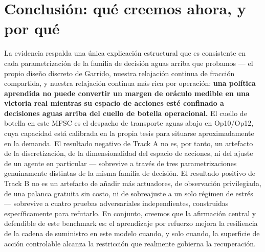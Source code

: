 \documentclass[11pt]{article}
\begin{document}
\section{Conclusión: qué creemos ahora, y por qué}

La evidencia respalda una única explicación estructural que es consistente
en cada parametrización de la familia de decisión aguas arriba que
probamos --- el propio diseño discreto de Garrido, nuestra relajación
continua de fracción compartida, y nuestra relajación continua más rica
por operación: \textbf{una política aprendida no puede convertir un margen
de oráculo medible en una victoria real mientras su espacio de acciones
esté confinado a decisiones aguas arriba del cuello de botella
operacional.} El cuello de botella en este MFSC es el despacho de
transporte aguas abajo en Op10/Op12, cuya capacidad está calibrada en la
propia tesis para situarse aproximadamente en la demanda. El resultado
negativo de Track A no es, por tanto, un artefacto de la discretización,
de la dimensionalidad del espacio de acciones, ni del ajuste de un agente
en particular --- sobrevive a través de tres parametrizaciones
genuinamente distintas de la misma familia de decisión. El resultado
positivo de Track B no es un artefacto de añadir más actuadores, de
observación privilegiada, de una palanca gratuita sin costo, ni de
sobreajuste a un solo régimen de estrés --- sobrevive a cuatro pruebas
adversariales independientes, construidas específicamente para
refutarlo. En conjunto, creemos que la afirmación central y defendible de
este benchmark es: el aprendizaje por refuerzo mejora la resiliencia de la
cadena de suministro en este modelo cuando, y solo cuando, la superficie
de acción controlable alcanza la restricción que realmente gobierna la
recuperación.
\end{document}
